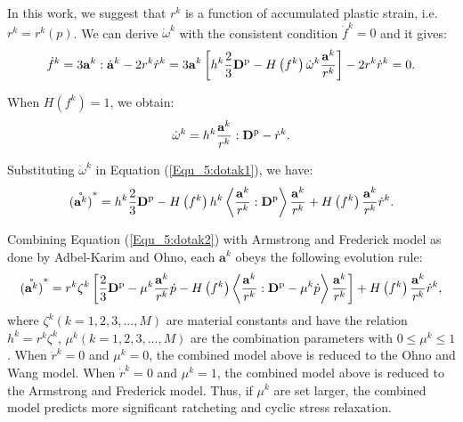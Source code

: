 In this work, we suggest that $r^k$ is a function of accumulated plastic strain, i.e. ${r^k} = {r^k}\left( p \right)$. We can derive ${\dot \omega ^k}$ with the consistent condition ${\dot f^k} = 0$ and it gives:
\begin{equation}
\label{Equ_5:dotfk}
{\dot f^k} = 3{{\mathbf{a}}^k}:{{\dot {\bf{a}}}^k} - 2{r^k}{\dot r^k} = 3{{\mathbf{a}}^k}\left[ {{h^k}\frac{2}{3}{{\mathbf{D}}^{\rm{p}}} - H\left( {{f^k}} \right){{\dot \omega }^k}\frac{{{{\mathbf{a}}^k}}}{{{r^k}}}} \right] - 2{r^k}{\dot r^k} = 0.
\end{equation}

When $H\left( {{f^k}} \right) = 1$, we obtain:
\begin{equation}
\label{Equ_5:dotomegak}
{\dot \omega ^k} = {h^k}\frac{{{{\mathbf{a}}^k}}}{{{r^k}}}:{{\mathbf{D}}^{\rm{p}}} - {\dot r^k}.
\end{equation}

Substituting ${\dot \omega ^k}$ in Equation (\ref{Equ_5:dotak1}), we have:
\begin{equation}
\label{Equ_5:dotak2}
\mathring{\left({\mathbf{a}}^{k}\right)}^* = {h^k}\frac{2}{3}{{\mathbf{D}}^{\rm{p}}} - H\left( {{f^k}} \right){h^k}\left\langle {\frac{{{{\mathbf{a}}^k}}}{{{r^k}}}:{{\mathbf{D}}^{\rm{p}}}} \right\rangle \frac{{{{\mathbf{a}}^k}}}{{{r^k}}} + H\left( {{f^k}} \right)\frac{{{{\mathbf{a}}^k}}}{{{r^k}}}{\dot r^k}.
\end{equation}

Combining Equation (\ref{Equ_5:dotak2}) with Armstrong and Frederick model as done by Adbel-Karim and Ohno, each ${{\mathbf{a}}^k}$ obeys the following evolution rule:
\begin{equation}
\label{Equ_5:dotak3}
\mathring{\left({\mathbf{a}}^{k}\right)}^* = {r^k}{\zeta ^k}\left[ {\frac{2}{3}{{\mathbf{D}}^{\rm{p}}} - {\mu ^k}\frac{{{{\mathbf{a}}^k}}}{{{r^k}}}\dot p - H\left( {{f^k}} \right)\left\langle {\frac{{{{\mathbf{a}}^k}}}{{{r^k}}}:{{\mathbf{D}}^{\rm{p}}} - {\mu ^k}\dot p} \right\rangle \frac{{{{\mathbf{a}}^k}}}{{{r^k}}}} \right] + H\left( {{f^k}} \right)\frac{{{{\mathbf{a}}^k}}}{{{r^k}}}{\dot r^k},
\end{equation}
where ${\zeta ^k}( k = 1,2,3,...,M )$ are material constants and have the relation ${h^k} = {r^k}{\zeta ^k}$, ${\mu ^k}( k = 1,2,3,...,M )$ are the combination parameters with $0 \leqslant {\mu ^k} \leqslant 1$. When ${\dot r^k} = 0$ and ${\mu ^k} = 0$, the combined model above is reduced to the Ohno and Wang model. When ${\dot r^k} = 0$ and ${\mu ^k} = 1$, the combined model above is reduced to the Armstrong and Frederick model. Thus, if ${\mu ^k}$ are set larger, the combined model predicts more significant ratcheting and cyclic stress relaxation.


